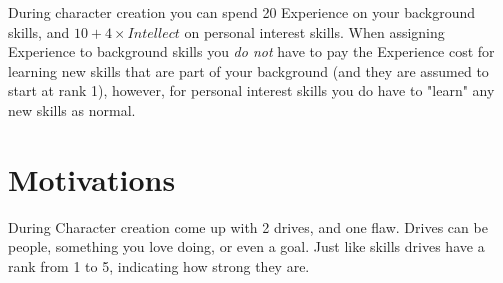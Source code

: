 During character creation you can spend 20 Experience on your background skills,
and $10 + 4\times Intellect$ on personal interest skills. 
When assigning Experience to background skills you \textit{do not} have to pay 
the Experience cost for learning new skills that are part of your background (and they are assumed to start at rank 1),
however, for personal interest skills you do have to "learn" any new skills as normal.



\chapter{Motivations}
During Character creation come up with 2 drives, and one flaw.
Drives can be people, something you love doing, or even a goal. 
Just like skills drives have a rank from 1 to 5, indicating how strong they are.

